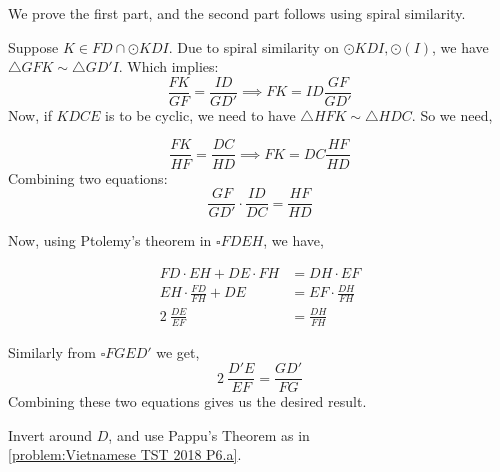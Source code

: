 \begin{solution} 
    \label{problem:vietTST2018P6.a}


    We prove the first part, and the second part follows using spiral
    similarity.

    Suppose $ K\in FD\cap \odot KDI $. Due to spiral similarity on $ \odot
    KDI, \odot (I) $, we have $ \triangle GFK \sim \triangle GD'I $. Which
    implies: \[\frac{FK}{GF}=\frac{ID}{GD'} \implies FK = ID\frac{GF}{GD'}\]
    Now, if $ KDCE $ is to be cyclic, we need to have $ \triangle HFK \sim
    \triangle HDC $. So we need, 

    \[\frac{FK}{HF}=\frac{DC}{HD}\implies FK=DC\frac{HF}{HD}\] 
    Combining two equations: 
    \[\frac{GF}{GD'}\cdot \frac{ID}{DC}=\frac{HF}{HD}\]

    Now, using Ptolemy's theorem in $ \square FDEH $, we have, 

    \begin{align*}
        FD\cdot EH + DE\cdot FH &= DH\cdot EF\\ 
        EH \cdot \frac{FD}{FH} + DE &= EF \cdot\frac{DH}{FH}\\ 
        2\ \frac{DE}{EF} &= \frac{DH}{FH} 
    \end{align*} 

    Similarly from $ \square FGED' $ we get, \[2\ \frac{D'E}{EF} =
    \frac{GD'}{FG}\] Combining these two equations gives us the desired result.  
\end{solution}


\begin{minipage}{.45\linewidth}

    \begin{solution}[Inversion] 
        Invert
        around $ D $, and use Pappu's Theorem as in\\ \autoref{problem:Vietnamese TST
        2018 P6.a}.  
    \end{solution} 
\end{minipage}\hfill%
\begin{minipage}{.52\linewidth}
\end{minipage}

